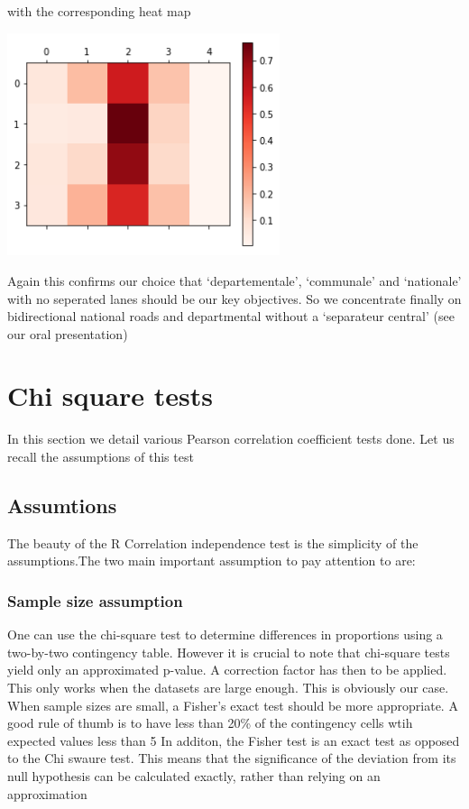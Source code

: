 \documentclass[a4paper]{article}
\theoremstyle{definition}
\theoremstyle{proposition}
\begin{document}
with the corresponding heat map


\includegraphics[width=8cm]{heatmap_roads_category_circ.png}\label{heatmap_roads_category_circ}

Again this confirms our choice that `departementale', `communale' and `nationale' with no seperated lanes should be our key objectives. So we concentrate finally on bidirectional national roads and departmental without a `separateur central' (see our oral presentation)


\section{Chi square tests}
In this section we detail various Pearson correlation coefficient  tests done. Let us recall the assumptions of this test

\subsection{Assumtions}
The beauty of the R Correlation independence test is the simplicity of the assumptions.The two main important assumption to pay attention to are:

\subsubsection{Sample size assumption}
One can use the chi-square test to determine differences in proportions using a two-by-two contingency table. However it is crucial to note that chi-square tests yield only an approximated p-value. A correction factor has then to be applied. This only works when the datasets are large enough. This is obviously our case. When sample sizes are small, a Fisher's exact test  should be more appropriate. A good rule of thumb is to have less than 20\% of the contingency cells wtih expected values less than 5 
In additon, the Fisher test is an exact test as opposed to the Chi swaure test. This means that the significance of the deviation from its null hypothesis can be calculated exactly, rather than relying on an approximation
\end{document}
